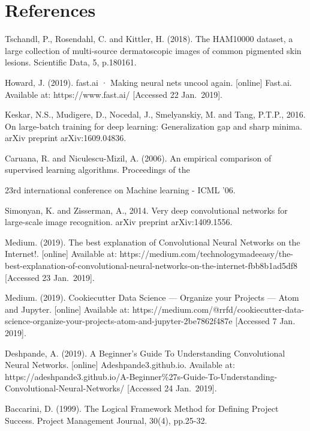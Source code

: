 \documentclass[11pt]{article}
\begin{document}
    \hypertarget{references}{%
\section{References}\label{references}}

Tschandl, P., Rosendahl, C. and Kittler, H. (2018). The HAM10000
dataset, a large collection of multi-source dermatoscopic images of
common pigmented skin lesions. Scientific Data, 5, p.180161.

Howard, J. (2019). fast.ai · Making neural nets uncool again.
{[}online{]} Fast.ai. Available at: https://www.fast.ai/ {[}Accessed 22
Jan.~2019{]}.

Keskar, N.S., Mudigere, D., Nocedal, J., Smelyanskiy, M. and Tang,
P.T.P., 2016. On large-batch training for deep learning: Generalization
gap and sharp minima. arXiv preprint arXiv:1609.04836.

Caruana, R. and Niculescu-Mizil, A. (2006). An empirical comparison of
supervised learning algorithms. Proceedings of the

23rd international conference on Machine learning - ICML '06.

Simonyan, K. and Zisserman, A., 2014. Very deep convolutional networks
for large-scale image recognition. arXiv preprint arXiv:1409.1556.

Medium. (2019). The best explanation of Convolutional Neural Networks on
the Internet!. {[}online{]} Available at:
https://medium.com/technologymadeeasy/the-best-explanation-of-convolutional-neural-networks-on-the-internet-fbb8b1ad5df8
{[}Accessed 23 Jan.~2019{]}.

Medium. (2019). Cookiecutter Data Science --- Organize your Projects ---
Atom and Jupyter. {[}online{]} Available at:
https://medium.com/@rrfd/cookiecutter-data-science-organize-your-projects-atom-and-jupyter-2be7862f487e
{[}Accessed 7 Jan. 2019{]}.

Deshpande, A. (2019). A Beginner's Guide To Understanding Convolutional
Neural Networks. {[}online{]} Adeshpande3.github.io. Available at:
https://adeshpande3.github.io/A-Beginner\%27s-Guide-To-Understanding-Convolutional-Neural-Networks/
{[}Accessed 24 Jan.~2019{]}.

Baccarini, D. (1999). The Logical Framework Method for Defining Project
Success. Project Management Journal, 30(4), pp.25-32.


    
    
    
    
\end{document}

